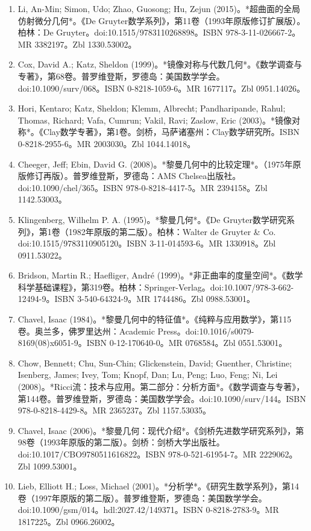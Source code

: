 \begin{enumerate}
\item Li, An-Min; Simon, Udo; Zhao, Guosong; Hu, Zejun (2015)。*超曲面的全局仿射微分几何*。《De Gruyter数学系列》，第11卷（1993年原版修订扩展版）。柏林：De Gruyter。doi:10.1515/9783110268898。ISBN 978-3-11-026667-2。MR 3382197。Zbl 1330.53002。  
\item Cox, David A.; Katz, Sheldon (1999)。*镜像对称与代数几何*。《数学调查与专著》，第68卷。普罗维登斯，罗德岛：美国数学学会。doi:10.1090/surv/068。ISBN 0-8218-1059-6。MR 1677117。Zbl 0951.14026。  
\item Hori, Kentaro; Katz, Sheldon; Klemm, Albrecht; Pandharipande, Rahul; Thomas, Richard; Vafa, Cumrun; Vakil, Ravi; Zaslow, Eric (2003)。*镜像对称*。《Clay数学专著》，第1卷。剑桥，马萨诸塞州：Clay数学研究所。ISBN 0-8218-2955-6。MR 2003030。Zbl 1044.14018。  
\item Cheeger, Jeff; Ebin, David G. (2008)。*黎曼几何中的比较定理*。（1975年原版修订再版）。普罗维登斯，罗德岛：AMS Chelsea出版社。doi:10.1090/chel/365。ISBN 978-0-8218-4417-5。MR 2394158。Zbl 1142.53003。
\item Klingenberg, Wilhelm P. A. (1995)。*黎曼几何*。《De Gruyter数学研究系列》，第1卷（1982年原版的第二版）。柏林：Walter de Gruyter & Co. doi:10.1515/9783110905120。ISBN 3-11-014593-6。MR 1330918。Zbl 0911.53022。  
\item Bridson, Martin R.; Haefliger, André (1999)。*非正曲率的度量空间*。《数学科学基础课程》，第319卷。柏林：Springer-Verlag。doi:10.1007/978-3-662-12494-9。ISBN 3-540-64324-9。MR 1744486。Zbl 0988.53001。  
\item Chavel, Isaac (1984)。*黎曼几何中的特征值*。《纯粹与应用数学》，第115卷。奥兰多，佛罗里达州：Academic Press。doi:10.1016/s0079-8169(08)x6051-9。ISBN 0-12-170640-0。MR 0768584。Zbl 0551.53001。  
\item Chow, Bennett; Chu, Sun-Chin; Glickenstein, David; Guenther, Christine; Isenberg, James; Ivey, Tom; Knopf, Dan; Lu, Peng; Luo, Feng; Ni, Lei (2008)。*Ricci流：技术与应用。第二部分：分析方面*。《数学调查与专著》，第144卷。普罗维登斯，罗德岛：美国数学学会。doi:10.1090/surv/144。ISBN 978-0-8218-4429-8。MR 2365237。Zbl 1157.53035。
\item Chavel, Isaac (2006)。*黎曼几何：现代介绍*。《剑桥先进数学研究系列》，第98卷（1993年原版的第二版）。剑桥：剑桥大学出版社。doi:10.1017/CBO9780511616822。ISBN 978-0-521-61954-7。MR 2229062。Zbl 1099.53001。  
\item Lieb, Elliott H.; Loss, Michael (2001)。*分析学*。《研究生数学系列》，第14卷（1997年原版的第二版）。普罗维登斯，罗德岛：美国数学学会。doi:10.1090/gsm/014。hdl:2027.42/149371。ISBN 0-8218-2783-9。MR 1817225。Zbl 0966.26002。  

\end{enumerate}
